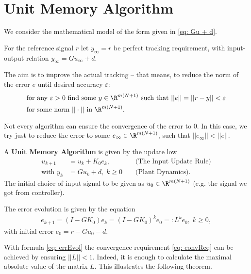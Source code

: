 \chapter{Unit Memory Algorithm}
 
 We consider the mathematical model of the form given in \eqref{eq: Gu + d}. 
 
 For the reference signal $r$ let $y_\infty = r$ be perfect tracking requirement, with input-output relation $y_\infty = G u_\infty + d$. 
 
 The aim is to improve the actual tracking -- that means, to reduce the norm of the error $e$ until desired accuracy $\varepsilon$: 
 \begin{align}
 \label{eq: convReq}
 \begin{split}
  &\text{for any } \varepsilon >0 \text{ find some } y \in \R^{m(N+1)} \text{ such that } ||e || = ||r - y|| < \varepsilon \\
 &\text{for some norm } ||\cdot|| \text{ in } \R^{m(N+1)}.
 \end{split}
  \end{align}
 
Not every algorithm can ensure the convergence of the error to 0. In this case, we try just to reduce the error to some $e_\infty \in \R^{m(N+1)}$, such that $||e_\infty|| < ||e||$. 

\begin{alg}
		A \textbf{Unit Memory Algorithm} is given by the update low 
		\begin{align}
		\label{eq: inpUpdR}
		u_{k+1} &= u_k + K_0 e_k,& &\text{ (The Input Update Rule)} \\
		\label{eq: inpUpdR:PlantDynamics}
		\text{with } y_k &= G u_k + d, \; k\geq 0& &\text{ (Plant Dynamics)}. 
		\end{align}
		The initial choice of input signal to be given as $u_0 \in \R^{m(N+1)}$ (e.g. the signal we got from controller). 
		
	    The error evolution is given by the equation 
	    \begin{align}
	    \label{eq: errEvol}
	    e_{k+1} = (I-G K_0) e_k = (I - G K_0)^k e_0 = : L^k e_0, \; k\geq 0,
	    \end{align}
	    with initial error $e_0 = r - G u_0 - d$. 
\end{alg}

With formula \eqref{eq: errEvol} the convergence requirement \eqref{eq: convReq} can be achieved by ensuring $||L||<1$. Indeed, it is enough to calculate the maximal absolute value of the matrix $L$. This illustrates the following theorem. 

